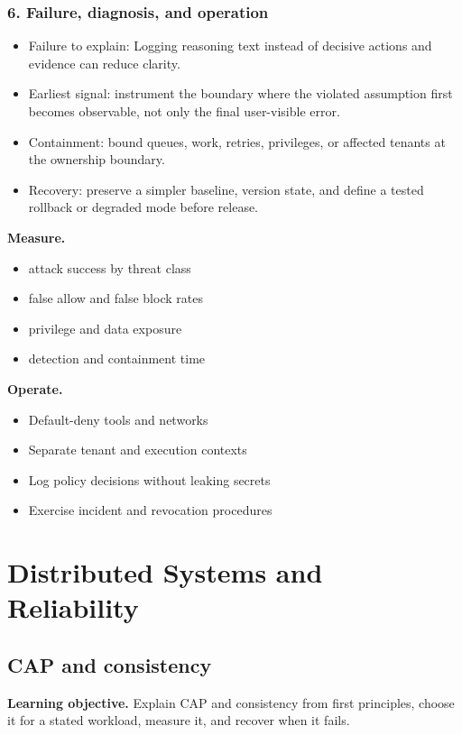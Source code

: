 \subsubsection*{6. Failure, diagnosis, and operation}
\begin{itemize}
\item Failure to explain: Logging reasoning text instead of decisive actions and evidence can reduce clarity.
\item Earliest signal: instrument the boundary where the violated assumption first becomes observable, not only the final user-visible error.
\item Containment: bound queues, work, retries, privileges, or affected tenants at the ownership boundary.
\item Recovery: preserve a simpler baseline, version state, and define a tested rollback or degraded mode before release.
\end{itemize}
\textbf{Measure.}\begin{itemize}
\item attack success by threat class
\item false allow and false block rates
\item privilege and data exposure
\item detection and containment time
\end{itemize}
\textbf{Operate.}\begin{itemize}
\item Default-deny tools and networks
\item Separate tenant and execution contexts
\item Log policy decisions without leaking secrets
\item Exercise incident and revocation procedures
\end{itemize}
\clearpage\section{Distributed Systems and Reliability}
\subsection{CAP and consistency}
\textbf{Learning objective.} Explain CAP and consistency from first principles, choose it for a stated workload, measure it, and recover when it fails.
